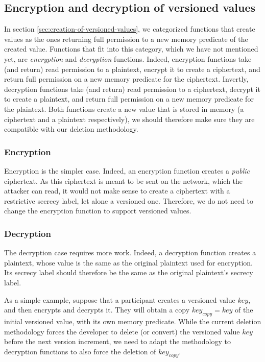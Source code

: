 \subsection{Encryption and decryption of versioned values}

In section \ref{sec:creation-of-versioned-values}, we categorized functions that create values as the ones returning full permission to a new memory predicate of the created value.
Functions that fit into this category, which we have not mentioned yet, are \emph{encryption} and \emph{decryption} functions.
Indeed, encryption functions take (and return) read permission to a plaintext, encrypt it to create a ciphertext, and return full permission on a new memory predicate for the ciphertext.
Invertly, decryption functions take (and return) read permission to a ciphertext, decrypt it to create a plaintext, and return full permission on a new memory predicate for the plaintext.
Both functions create a new value that is stored in memory (a ciphertext and a plaintext respectively), we should therefore make sure they are compatible with our deletion methodology.

\subsubsection{Encryption}

Encryption is the simpler case. Indeed, an encryption function creates a \emph{public} ciphertext.
As this ciphertext is meant to be sent on the network, which the attacker can read, it would not make sense to create a ciphertext with a restrictive secrecy label, let alone a versioned one.
Therefore, we do not need to change the encryption function to support versioned values.

\subsubsection{Decryption}

The decryption case requires more work. 
Indeed, a decryption function creates a plaintext, whose value is the same as the original plaintext used for encryption. 
Its secrecy label should therefore be the same as the original plaintext's secrecy label.

As a simple example, suppose that a participant creates a versioned value $key$, and then encrypts and decrypts it.
They will obtain a copy $key_{copy}=key$ of the initial versioned value, with its own memory predicate.
While the current deletion methodology forces the developer to delete (or convert) the versioned value $key$ before the next version increment, we need to adapt the methodology to decryption functions to also force the deletion of $key_{copy}$.

